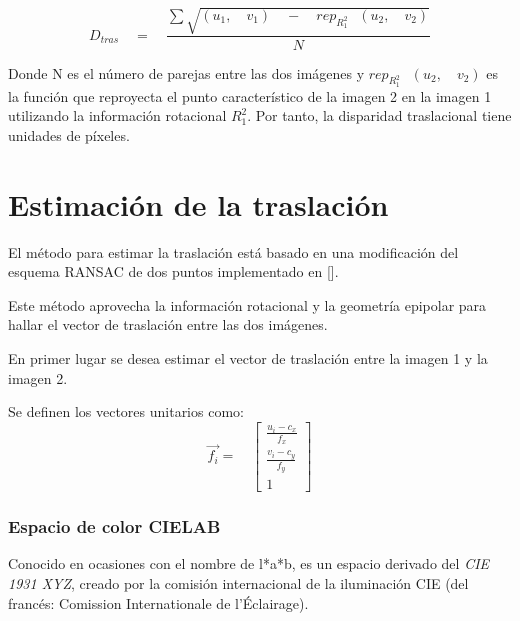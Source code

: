 \begin{equation}
{ D }_{ tras }\quad =\quad \frac { \sum { \sqrt { ({ u }_{ 1 },\quad { v }_{ 1 })\quad -\quad { rep }_{ { R }_{ 1 }^{ 2 }\quad  }({ u }_{ 2 },\quad { v }_{ 2 }) }  }  }{ N } 
\label{eq:DisparidadTraslacional}
\end{equation}

Donde N es el número de parejas entre las dos imágenes y ${ rep }_{ { R }_{ 1 }^{ 2 }\quad  }({ u }_{ 2 },\quad { v }_{ 2 })$ es la función que reproyecta el punto característico de la imagen 2 en la imagen 1 utilizando la información rotacional ${ R }_{ 1 }^{ 2}$. 
Por tanto, la disparidad traslacional tiene unidades de píxeles.



\section{Estimación de la traslación}

El método para estimar la traslación está basado en una modificación del esquema RANSAC de dos puntos implementado en [].
 
Este método aprovecha la información rotacional y la geometría epipolar para hallar el vector de traslación entre las dos imágenes.

En primer lugar se desea estimar el vector de traslación entre la imagen 1 y la imagen 2.

Se definen los vectores unitarios como:
\begin{equation}
\overset { \rightarrow  }{ { f }_{ i } } =\quad \left[ \begin{matrix} \frac { u_{ i }-{ c }_{ x } }{ { f }_{ x } }  \\ \frac { { v }_{ i }-{ c }_{ y } }{ { f }_{ y } }  \\ 1 \end{matrix} \right] 
\end{equation}







\subsubsection*{Espacio de color CIELAB}

Conocido en ocasiones con el nombre de l*a*b, es un espacio derivado del \textit{CIE 1931 XYZ}, creado por la comisión internacional de la iluminación CIE (del francés: Comission Internationale de l'Éclairage).

